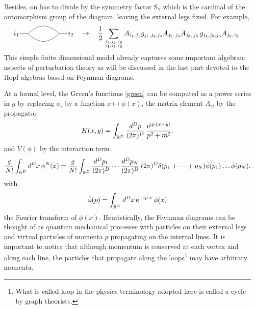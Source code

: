 \documentclass[10pt,here,feynmf]{article}
\begin{document}
Besides, on has to divide by the symmetry factor $\mathrm{S}_{\gamma}$ which is the cardinal of the automorphism group of the diagram, leaving the external legs fixed. For example,
\begin{equation}
i_{1}\,
\xy
(0,0)*{}="A"; 
(16,0)*{}="B"; 
(-4,0)*{}="C"; 
(20,0)*{}="D"; 
"C"; "A" **\crv{(-4,0)&(0,0)};
"A"; "B" **\crv{(0,0)&(8,8)&(16,0)};
"A"; "B" **\crv{(0,0)&(8,-8)&(16,0)};
"B"; "D" **\crv{(16,0)&(20,0)};
\endxy
\,i_{2}\quad
\rightarrow\quad
\frac{1}{2}
\sum_{j_{1},j_{2},j_{3}\atop
j_{4},j_{5},j_{6}}
A_{i_{1},j_{1}}
g_{j_{1},j_{2},j_{3}}
A_{j_{2},\,j_{4}}A_{j_{3},\,j_{5}}\,
g_{j_{4},j_{5},j_{6}}
A_{j_{6},\,i_{2}}.
\end{equation}
This simple finite dimensional model already captures  some important algebraic aspects of perturbation theory as will be discussed in the last part devoted to the Hopf algebras based on Feynman diagrams.

At a formal level, the Green's functions \eqref{green} can be computed as a power series in $g$ by replacing $\phi_{i}$ by a function $x\mapsto\phi(x)$, the matrix element $A_{ij}$ by the propagator
\begin{equation} 
K(x,y)=\int_{{\Bbb R}^{D}}\frac{d^{D}p}{(2\pi)^{D}}\,\frac{\mathrm{e}^{\mathrm{i}p\cdot(x-y)}}{p^{2}+m^{2}}.
\end{equation}
and $V(\phi)$ by the interaction term
\begin{equation}
\frac{g}{N!}\int_{{\Bbb R}^{D}} d^{D}x\,\phi^{N}(x)=
\frac{g}{N!}\int_{{\Bbb R}^{D}}\frac{d^{D}p_{1}}{(2\pi)^{D}}\cdots\frac{d^{D}p_{N}}{(2\pi)^{D}}\,(2\pi)^{D}\delta(p_{1}+\cdots+p_{N})\tilde{\phi}(p_{1})\dots\tilde{\phi}(p_{N}),
\end{equation}
with 
\begin{equation}
\tilde{\phi}(p)=\int_{{\Bbb R}^{D}}d^{D}x\,\mathrm{e}^{-\mathrm{i}p\cdot x}\,\phi(x)
\end{equation}
the Fourier transform of $\phi(x)$. Heuristically, the Feynman diagrams can be thought of as quantum mechanical processes with particles on their external legs and virtual particles of momenta $p$ propagating on the internal lines. It is important to notice that although momentum is conserved at each vertex and along each line, the particles that propagate along the loops\footnote{What is called loop in the physics terminology adopted here is called a cycle by graph theorists.} may have arbitrary momenta.
\end{document}
